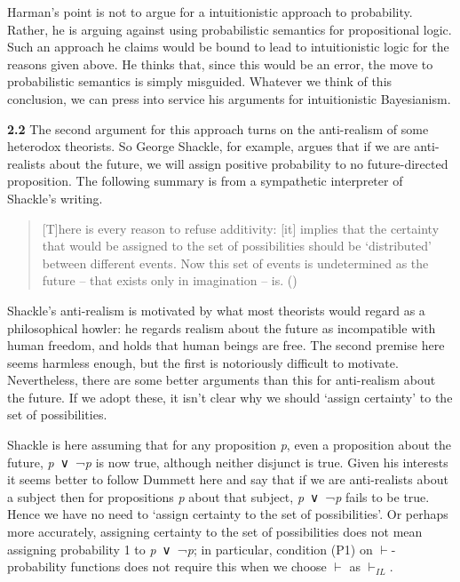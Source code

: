 \documentclass[
  11pt,
  letterpaper,
  DIV=11,
  numbers=noendperiod,
  twoside]{scrartcl}
\begin{document}
Harman's point is not to argue for a intuitionistic approach to
probability. Rather, he is arguing against using probabilistic semantics
for propositional logic. Such an approach he claims would be bound to
lead to intuitionistic logic for the reasons given above. He thinks
that, since this would be an error, the move to probabilistic semantics
is simply misguided. Whatever we think of this conclusion, we can press
into service his arguments for intuitionistic Bayesianism.

\textbf{2.2} The second argument for this approach turns on the
anti-realism of some heterodox theorists. So George Shackle, for
example, argues that if we are anti-realists about the future, we will
assign positive probability to no future-directed proposition. The
following summary is from a sympathetic interpreter of Shackle's
writing.

\begin{quote}
{[}T{]}here is every reason to refuse additivity: {[}it{]} implies that
the certainty that would be assigned to the set of possibilities should
be `distributed' between different events. Now this set of events is
undetermined as the future -- that exists only in imagination -- is.
()
\end{quote}

Shackle's anti-realism is motivated by what most theorists would regard
as a philosophical howler: he regards realism about the future as
incompatible with human freedom, and holds that human beings are free.
The second premise here seems harmless enough, but the first is
notoriously difficult to motivate. Nevertheless, there are some better
arguments than this for anti-realism about the future. If we adopt
these, it isn't clear why we should `assign certainty' to the set of
possibilities.

Shackle is here assuming that for any proposition \emph{p}, even a
proposition about the future, \emph{p}~∨~¬\emph{p} is now true, although
neither disjunct is true. Given his interests it seems better to follow
Dummett here and say that if we are anti-realists about a subject then
for propositions \emph{p} about that subject, \emph{p}~∨~¬\emph{p} fails
to be true. Hence we have no need to `assign certainty to the set of
possibilities'. Or perhaps more accurately, assigning certainty to the
set of possibilities does not mean assigning probability 1 to
\emph{p}~∨~¬\emph{p}; in particular, condition (P1) on
\(\vdash\)-probability functions does not require this when we choose
\(\vdash\) as \(\vdash_{IL}\).
\end{document}
